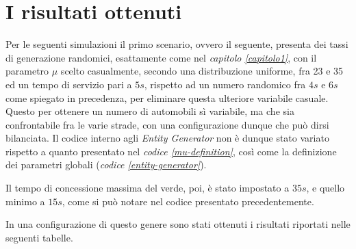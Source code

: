 \newpage
\section{I risultati ottenuti}
Per le seguenti simulazioni il primo scenario, ovvero il seguente, presenta dei tassi di generazione randomici, esattamente come nel \textit{capitolo \ref{capitolo1}}, con il parametro $\mu$ scelto casualmente, secondo una distribuzione uniforme, fra 23 e 35 ed un tempo di servizio pari a $5s$, rispetto ad un numero randomico fra $4s$ e $6s$ come spiegato in precedenza, per eliminare questa ulteriore variabile casuale. Questo per ottenere un numero di automobili sì variabile, ma che sia confrontabile fra le varie strade, con una configurazione dunque che può dirsi bilanciata. Il codice interno agli \textit{Entity Generator} non è dunque stato variato rispetto a quanto presentato nel \textit{codice \ref{mu-definition}}, così come la definizione dei parametri globali (\textit{codice \ref{entity-generator}}).

Il tempo di concessione massima del verde, poi, è stato impostato a $35s$, e quello minimo a $15s$, come si può notare nel codice presentato precedentemente.

In una configurazione di questo genere sono stati ottenuti i risultati riportati nelle seguenti tabelle.
\newline

